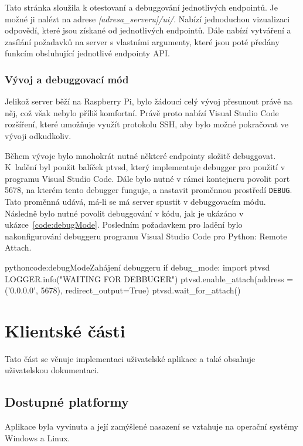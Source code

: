 \documentclass[
  glossaries,
]{kidiplom}
\begin{document}
Tato stránka sloužila k otestovaní a debuggování jednotlivých endpointů. Je možné ji nalézt na adrese \mbox{\textit{[adresa\_serveru]/ui/}}. Nabízí jednoduchou vizualizaci odpovědí, které jsou získané od jednotlivých endpointů. Dále nabízí vytváření a zasílání požadavků na server s vlastními argumenty, které jsou poté předány funkcím obsluhující jednotlivé endpointy API.

\clearpage
\subsubsection{Vývoj a debuggovací mód}
Jelikož server běží na Raspberry Pi, bylo žádoucí celý vývoj přesunout právě na něj, což však nebylo příliš komfortní. Právě proto nabízí Visual Studio Code rozšíření, které umožňuje využít protokolu SSH, aby bylo možné pokračovat ve vývoji odkudkoliv.

Během vývoje bylo mnohokrát nutné některé endpointy složitě debuggovat. K~ladění byl použit balíček ptvsd, který implementuje debugger pro použití v programu Visual Studio Code. Dále bylo nutné v rámci kontejneru povolit port 5678, na kterém tento debugger funguje, a nastavit proměnnou prostředí \texttt{DEBUG}. Tato proměnná udává, má-li se má server spustit v debuggovacím módu. Následně bylo nutné povolit debuggování v kódu, jak je ukázáno v ukázce~\ref{code:debugMode}. Posledním požadavkem pro ladění bylo nakonfigurování debuggeru programu Visual Studio Code pro Python: Remote Attach. 
\begin{kicode}{python}{code:debugMode}{Zahájení debuggeru}
    if debug_mode:
        import ptvsd
        LOGGER.info("WAITING FOR DEBBUGER")
        ptvsd.enable_attach(address = ('0.0.0.0', 5678), redirect_output=True)
        ptvsd.wait_for_attach()
\end{kicode}
\clearpage
\section{Klientské části}
Tato část se věnuje implementaci uživatelské aplikace a také obsahuje uživatelskou dokumentaci.

\subsection{Dostupné platformy}
Aplikace byla vyvinuta a její zamýšlené nasazení se vztahuje na operační systémy Windows a Linux.
\end{document}
